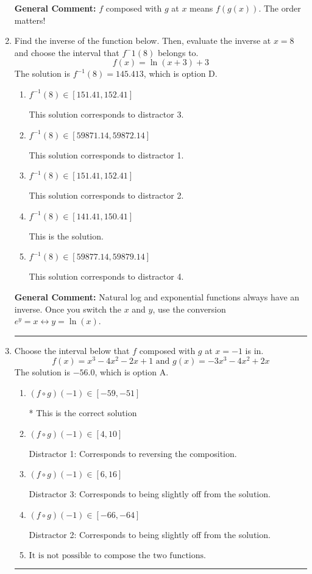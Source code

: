 \documentclass{extbook}[14pt]
\newcommand{\litem}[1]{\item #1

\rule{\textwidth}{0.4pt}}
\begin{document}
\begin{enumerate}
{\begin{enumerate}[label=\Alph*.]
\end{enumerate}

\textbf{General Comment:} $f$ composed with $g$ at $x$ means $f(g(x))$. The order matters!
}
\litem{
Find the inverse of the function below. Then, evaluate the inverse at $x = 8$ and choose the interval that $f^-1(8)$ belongs to.
\[ f(x) = \ln{(x+3)}+3 \]The solution is \( f^{-1}(8) = 145.413 \), which is option D.\begin{enumerate}[label=\Alph*.]
\item \( f^{-1}(8) \in [151.41, 152.41] \)

 This solution corresponds to distractor 3.
\item \( f^{-1}(8) \in [59871.14, 59872.14] \)

 This solution corresponds to distractor 1.
\item \( f^{-1}(8) \in [151.41, 152.41] \)

 This solution corresponds to distractor 2.
\item \( f^{-1}(8) \in [141.41, 150.41] \)

 This is the solution.
\item \( f^{-1}(8) \in [59877.14, 59879.14] \)

 This solution corresponds to distractor 4.
\end{enumerate}

\textbf{General Comment:} Natural log and exponential functions always have an inverse. Once you switch the $x$ and $y$, use the conversion $ e^y = x \leftrightarrow y=\ln(x)$.
}
\litem{
Choose the interval below that $f$ composed with $g$ at $x=-1$ is in.
\[ f(x) = x^{3} -4 x^{2} -2 x + 1 \text{ and } g(x) = -3x^{3} -4 x^{2} +2 x \]The solution is \( -56.0 \), which is option A.\begin{enumerate}[label=\Alph*.]
\item \( (f \circ g)(-1) \in [-59, -51] \)

* This is the correct solution
\item \( (f \circ g)(-1) \in [4, 10] \)

 Distractor 1: Corresponds to reversing the composition.
\item \( (f \circ g)(-1) \in [6, 16] \)

 Distractor 3: Corresponds to being slightly off from the solution.
\item \( (f \circ g)(-1) \in [-66, -64] \)

 Distractor 2: Corresponds to being slightly off from the solution.
\item \( \text{It is not possible to compose the two functions.} \)



\end{enumerate}}
\end{enumerate}
\end{document}
